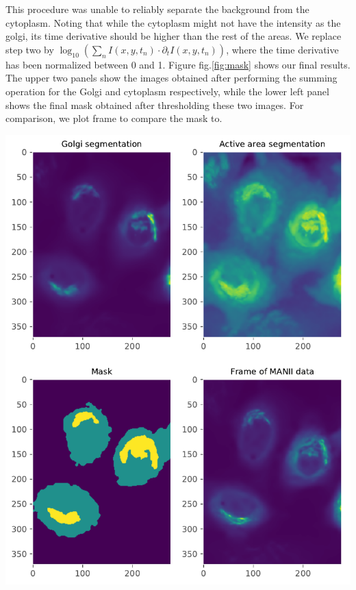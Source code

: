 \documentclass{Dissertate}
\let\origfigure\figure
\let\endorigfigure\endfigure
\renewenvironment{figure}[1][2] {
    \expandafter\origfigure\expandafter[H]
} {
    \endorigfigure
}
\begin{document}
This procedure was unable to reliably separate the background from the
cytoplasm. Noting that while the cytoplasm might not have the intensity
as the golgi, its time derivative should be higher than the rest of the
areas. We replace step two by
\(\log_{10}\left(\sum_nI(x,y,t_n)\cdot\partial_tI(x,y,t_n)\right)\),
where the time derivative has been normalized between 0 and 1. Figure
fig.\ref{fig:mask} shows our final results. The upper two panels show
the images obtained after performing the summing operation for the Golgi
and cytoplasm respectively, while the lower left panel shows the final
mask obtained after thresholding these two images. For comparison, we
plot frame to compare the mask to.

\begin{figure}
\hypertarget{fig:mask}{%
\centering
\includegraphics{source/figures/pdf/segmenting.pdf}
\caption{Four panels showing the different stages of making the mask.
From segmenting the upper two panels we determine the golgi and active
area, leading to the mask in the lower left. Compare the to the lower
right.}\label{fig:mask}
}
\end{figure}
\end{document}
